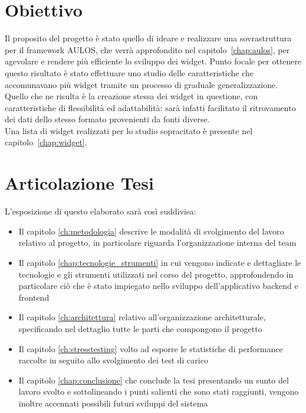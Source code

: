 \section{Obiettivo}
Il proposito del progetto è stato quello di ideare e realizzare una sovrastruttura per il framework AULOS, che verrà approfondito nel capitolo~\ref{chap:aulos}, per agevolare e rendere più efficiente lo sviluppo dei widget. Punto focale per ottenere questo risultato è stato effettuare uno studio delle caratteristiche che accomunavano più widget tramite un processo di graduale generalizzazione.
Quello che ne risulta è la creazione stessa dei widget in questione, con caratteristiche di flessibilità ed adattabilità: sarà infatti facilitato il ritrovamento dei dati dello stesso formato provenienti da fonti diverse. \\
Una lista di widget realizzati per lo studio sopracitato è presente nel capitolo~\ref{chap:widget}.

\section{Articolazione Tesi}
L'esposizione di questo elaborato sarà così suddivisa:
\begin{itemize}
    \item Il capitolo \ref{ch:metodologia} descrive le modalità di svolgimento del lavoro relativo al progetto, in particolare riguarda l'organizzazione interna del team
    \item Il capitolo \ref{chap:tecnologie_strumenti} in cui vengono indicate e dettagliare le tecnologie e gli strumenti utilizzati nel corso del progetto, approfondendo in particolare ciò che è stato impiegato nello sviluppo dell'applicativo backend e frontend
    \item Il capitolo \ref{ch:architettura} relativo all'organizzazione architetturale, specificando nel dettaglio tutte le parti che compongono il progetto
    \item Il capitolo \ref{ch:stresstesting} volto ad esporre le statistiche di performance raccolte in seguito allo svolgimento dei test di carico
    \item Il capitolo \ref{chap:conclusione} che conclude la tesi presentando un sunto del lavoro svolto e sottolineando i punti salienti che sono stati raggiunti, vengono inoltre accennati possibili futuri sviluppi del sistema
\end{itemize}